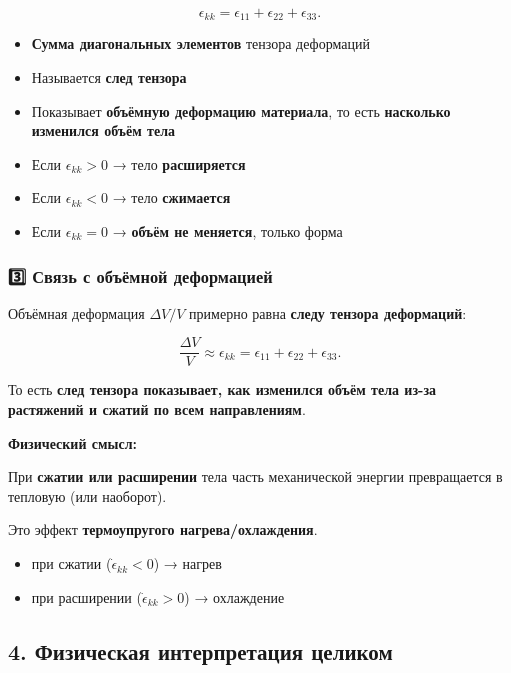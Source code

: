 \[
\epsilon_{kk} = \epsilon_{11} + \epsilon_{22} + \epsilon_{33}.
\]

\begin{itemize}
    \item \textbf{Сумма диагональных элементов} тензора деформаций
    \item Называется \textbf{след тензора}
    \item Показывает \textbf{объёмную деформацию материала}, то есть \textbf{насколько изменился объём тела}
\end{itemize}

\begin{itemize}
    \item Если \(\epsilon_{kk} > 0\) → тело \textbf{расширяется}
    \item Если \(\epsilon_{kk} < 0\) → тело \textbf{сжимается}
    \item Если \(\epsilon_{kk} = 0\) → \textbf{объём не меняется}, только форма
\end{itemize}

\subsubsection{3️⃣ Связь с объёмной деформацией}

Объёмная деформация \(\Delta V / V\) примерно равна \textbf{следу тензора деформаций}:

\[
\frac{\Delta V}{V} \approx \epsilon_{kk} = \epsilon_{11} + \epsilon_{22} + \epsilon_{33}.
\]

То есть \textbf{след тензора показывает, как изменился объём тела из-за растяжений и сжатий по всем направлениям}.

\textbf{Физический смысл:}  

При \textbf{сжатии или расширении} тела часть механической энергии превращается в тепловую (или наоборот).  

Это эффект \textbf{термоупругого нагрева/охлаждения}.

\begin{itemize}
    \item при сжатии (\(\dot{\epsilon}_{kk} < 0\)) → нагрев
    \item при расширении (\(\dot{\epsilon}_{kk} > 0\)) → охлаждение
\end{itemize}

\subsection{4. Физическая интерпретация целиком}

